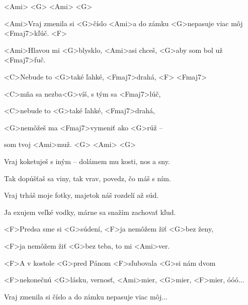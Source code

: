 


<Ami> <G> <Ami> <G>

\zs
<Ami>Vraj zmenila si <G>číslo <Ami>a do zámku <G>nepasuje viac môj <Fmaj7>kľúč. <F>

<Ami>Hlavou mi <G>blysklo, <Ami>asi chceš, <G>aby som bol už <Fmaj7>fuč.
\ks

\zr
<C>Nebude to <G>také ľahké, <Fmaj7>drahá, <F> <Fmaj7>

<C>mňa sa nezba<G>víš, s tým sa <Fmaj7>lúč,

<C>nebude to <G>také ľahké, <Fmaj7>drahá,

<G>nemôžeš ma <Fmaj7>vymeniť ako <G>rúž --

som tvoj <Ami>muž. <G> <Ami> <G>
\kr

\zs
Vraj koketuješ s iným -- dolámem mu kosti, nos a sny.

Tak dopúšťaš sa viny, tak vrav, povedz, čo máš s ním.
\ks

\zr \kr

\zs
Vraj trháš moje fotky, majetok náš rozdelí až súd.

Ja exujem veľké vodky, márne sa snažím zachovať kľud.
\ks

\zr \kr

\zs
<F>Predsa sme si <G>súdení, <F>ja nemôžem žiť <G>bez ženy,

<F>ja nemôžem žiť <G>bez teba, to mi <Ami>ver.

<F>A v kostole <G>pred Pánom <F>sľubovala <G>si nám dvom

<F>nekonečnú <G>lásku, vernosť, <Ami>mier, <G>mier, <F>mier, óóó...
\ks

\zr \kr

\zs
Vraj zmenila si číslo a do zámku nepasuje viac môj...
\ks

\kp





